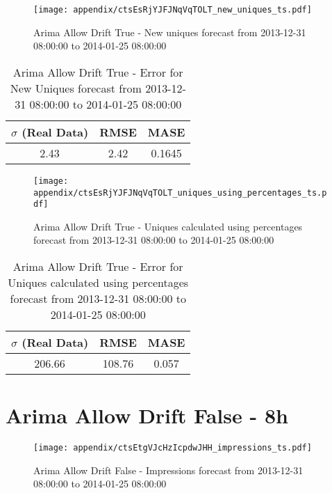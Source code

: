 \begin{figure}[H] \begin{center} \leavevmode
\texttt{[image: appendix/ctsEsRjYJFJNqVqTOLT\_new\_uniques\_ts.pdf]} \caption{
Arima Allow Drift True - New uniques forecast from 2013-12-31 08:00:00 to 2014-01-25 08:00:00} \label{fig:appendix/ctsEsRjYJFJNqVqTOLT_new_uniques_ts.pdf} \end{center}
\end{figure}

\begin{table}[H]
\centering
\footnotesize
\begin{tabular}{ccc}
$\sigma$ (Real Data) & RMSE & MASE   \\ \hline
2.43 & 2.42 & 0.1645 \\
\end{tabular}

\vspace{0.5cm}

\caption{
Arima Allow Drift True - Error for New Uniques forecast from 2013-12-31 08:00:00 to 2014-01-25 08:00:00}
\end{table}

\begin{figure}[H] \begin{center} \leavevmode
\texttt{[image: appendix/ctsEsRjYJFJNqVqTOLT\_uniques\_using\_percentages\_ts.pdf]} \caption{
Arima Allow Drift True - Uniques calculated using percentages forecast from 2013-12-31 08:00:00 to 2014-01-25 08:00:00} \label{fig:appendix/ctsEsRjYJFJNqVqTOLT_uniques_using_percentages_ts.pdf} \end{center}
\end{figure}

\begin{table}[H]
\centering
\footnotesize
\begin{tabular}{ccc}
$\sigma$ (Real Data) & RMSE & MASE   \\ \hline
206.66 & 108.76 & 0.057 \\
\end{tabular}

\vspace{0.5cm}

\caption{
Arima Allow Drift True - Error for Uniques calculated using percentages forecast from 2013-12-31 08:00:00 to 2014-01-25 08:00:00}
\end{table}

\section{Arima Allow Drift False - 8h}
\begin{figure}[H] \begin{center} \leavevmode
\texttt{[image: appendix/ctsEtgVJcHzIcpdwJHH\_impressions\_ts.pdf]} \caption{
Arima Allow Drift False - Impressions forecast from 2013-12-31 08:00:00 to 2014-01-25 08:00:00} \label{fig:appendix/ctsEtgVJcHzIcpdwJHH_impressions_ts.pdf} \end{center}
\end{figure}

